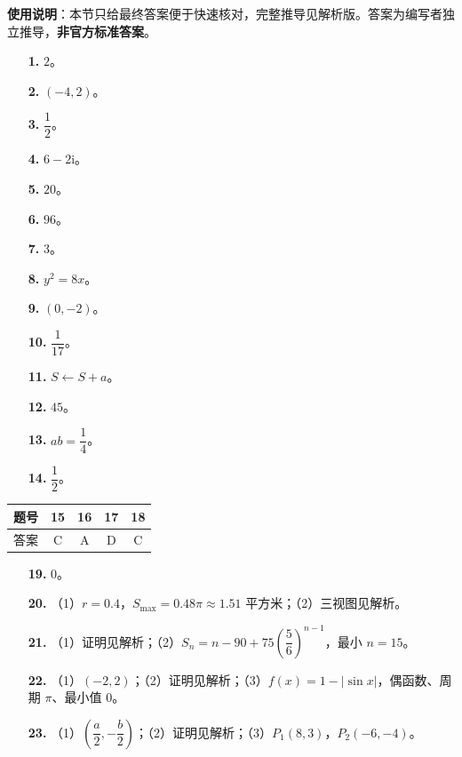 
\begin{gknotice}
\textbf{使用说明}：本节只给最终答案便于快速核对，完整推导见解析版。答案为编写者独立推导，\textbf{非官方标准答案}。
\end{gknotice}

\begin{itemize}[leftmargin=2.6em]
  \item[\textbf{1.}] $2$。
  \item[\textbf{2.}] $(-4,2)$。
  \item[\textbf{3.}] $\dfrac12$。
  \item[\textbf{4.}] $6-2\mathrm i$。
  \item[\textbf{5.}] $20$。
  \item[\textbf{6.}] $96$。
  \item[\textbf{7.}] $3$。
  \item[\textbf{8.}] $y^2=8x$。
  \item[\textbf{9.}] $(0,-2)$。
  \item[\textbf{10.}] $\dfrac1{17}$。
  \item[\textbf{11.}] $S\leftarrow S+a$。
  \item[\textbf{12.}] $45$。
  \item[\textbf{13.}] $ab=\dfrac14$。
  \item[\textbf{14.}] $\dfrac12$。
\end{itemize}

\begin{center}\begin{tabular}{ccccc}
\toprule
题号 & 15 & 16 & 17 & 18 \\
\midrule
答案 & C & A & D & C \\
\bottomrule
\end{tabular}\end{center}

\begin{itemize}[leftmargin=2.6em]
  \item[\textbf{19.}] $0$。
  \item[\textbf{20.}] （1）$r=0.4$，$S_{\max}=0.48\pi\approx1.51$ 平方米；（2）三视图见解析。
  \item[\textbf{21.}] （1）证明见解析；（2）$S_n=n-90+75\left(\dfrac56\right)^{n-1}$，最小 $n=15$。
  \item[\textbf{22.}] （1）$(-2,2)$；（2）证明见解析；（3）$f(x)=1-\lvert\sin x\rvert$，偶函数、周期 $\pi$、最小值 $0$。
  \item[\textbf{23.}] （1）$\left(\dfrac a2,-\dfrac b2\right)$；（2）证明见解析；（3）$P_1(8,3)$，$P_2(-6,-4)$。
\end{itemize}
